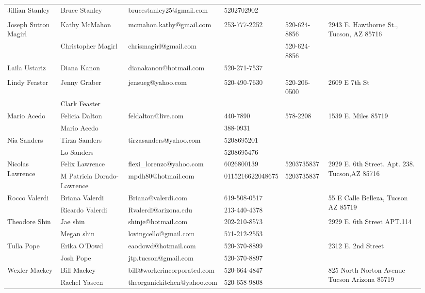 \documentclass[landscape]{article}\usepackage[]{graphicx}\usepackage[]{color}
\begin{document}
\begin{longtable}{|p{100pt}|p{100pt}|p{140pt}|p{60pt}|p{64pt}|p{120pt}|}
\hline
\multirow{2}{100pt}{Jillian Stanley} & Bruce Stanley & brucestanley25@gmail.com & 5202702902 &  & \multirow{2}{120pt}{} \\
 &  &  &  &  & \\
\hline
\multirow{2}{100pt}{Joseph Sutton Magirl} & Kathy McMahon & mcmahon.kathy@gmail.com & 253-777-2252 & 520-624-8856 & \multirow{2}{120pt}{2943 E. Hawthorne St., Tucson, AZ 85716} \\
 & Christopher Magirl & chrismagirl@gmail.com &  & 520-624-8856 & \\
\hline
\multirow{2}{100pt}{Laila Ustariz} & Diana Kanon & dianakanon@hotmail.com & 520-271-7537 &  & \multirow{2}{120pt}{} \\
 &  &  &  &  & \\
\hline
\multirow{2}{100pt}{Lindy Feaster} & Jenny Graber & jensueg@yahoo.com & 520-490-7630 & 520-206-0500 & \multirow{2}{120pt}{2609 E 7th St} \\
 & Clark Feaster &  &  &  & \\
\hline
\multirow{2}{100pt}{Mario Acedo} & Felicia Dalton & feldalton@live.com & 440-7890 & 578-2208 & \multirow{2}{120pt}{1539 E. Miles 85719} \\
 & Mario Acedo &  & 388-0931 &  & \\
\hline
\multirow{2}{100pt}{Nia Sanders} & Tirza Sanders & tirzasanders@yahoo.com & 5208695201 &  & \multirow{2}{120pt}{} \\
 & Lo Sanders &  & 5208695476 &  & \\
\hline
\multirow{2}{100pt}{Nicolas Lawrence} & Felix Lawrence & flexi\_lorenzo@yahoo.com & 6026800139 & 5203735837 & \multirow{2}{120pt}{2929 E. 6th Street. Apt. 238. Tucson,AZ 85716} \\
 & M Patricia Dorado-Lawrence & mpdh80@hotmail.com & 0115216622048675 & 5203735837 & \\
\hline
\multirow{2}{100pt}{Rocco Valerdi } & Briana Valerdi & Briana@valerdi.com & 619-508-0517 &  & \multirow{2}{120pt}{55 E Calle Belleza, Tucson AZ 85719} \\
 & Ricardo Valerdi & Rvalerdi@arizona.edu & 213-440-4378 &  & \\
\hline
\multirow{2}{100pt}{Theodore Shin} & Jae shin & shinje@hotmail.com & 202-210-8573 &  & \multirow{2}{120pt}{2929 E. 6th Street APT.114} \\
 & Megan shin & lovingcello@gmail.com & 571-212-2553 &  & \\
\hline
\multirow{2}{100pt}{Tulla Pope} & Erika O'Dowd & eaodowd@hotmail.com & 520-370-8899 &  & \multirow{2}{120pt}{2312 E. 2nd Street} \\
 & Josh Pope & jtp.tucson@gmail.com & 520-370-8897 &  & \\
\hline
\multirow{2}{100pt}{Wexler Mackey} & Bill Mackey & bill@workerincorporated.com & 520-664-4847 &  & \multirow{2}{120pt}{825 North Norton Avenue Tucson Arizona 85719} \\
 & Rachel Yaseen & theorganickitchen@yahoo.com & 520-658-9808 &  & \\
\hline
\end{longtable}
\newpage
\end{document}
